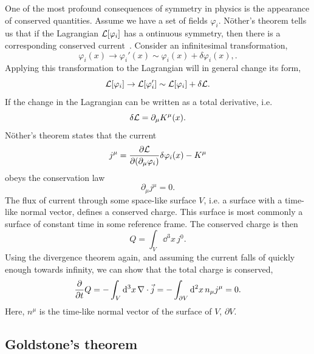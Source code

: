 One of the most profound consequences of symmetry in physics is the appearance of conserved quantities.
Assume we have a set of fields $\varphi_i$. Nöther's theorem tells us that if the Lagrangian $\mathcal{L}[\varphi_i]$ has a ontinuous symmetry, then there is a corresponding conserved current~\cite{Peskin:IntroQFT,Carroll:spacetime}.
Consider an infinitesimal transformation,
\begin{equation*}
    \varphi_i(x) \longrightarrow \varphi_i'(x)
    \sim \varphi_i(x) + \delta \varphi_i(x),.
\end{equation*}
Applying this transformation to the Lagrangian will in general change its form,
\begin{equation*}
    \mathcal{L}[\varphi_i] \rightarrow \mathcal{L}[\varphi_i']
    \sim \mathcal{L}[\varphi_i] + \delta \mathcal{L}.
\end{equation*}
If the change in the Lagrangian can be written as a total derivative, i.e.
\begin{equation*}
    \delta \mathcal{L} = \partial_\mu K^\mu(x).
\end{equation*}
Nöther's theorem states that the current
\begin{equation}
    j^\mu = \pdv{\mathcal{L}}{(\partial_\mu \varphi_i)} \delta \varphi_i(x) - K^\mu
\end{equation}
obeys the conservation law
\begin{equation}
    \partial_\mu j^\mu = 0.
\end{equation}
The flux of current through some space-like surface $V$, i.e. a surface with a time-like normal vector, defines a conserved charge. This surface is most commonly a surface of constant time in some reference frame. The conserved charge is then
\begin{equation*}
    Q = \int_V \dd^3 x \, j^0.
\end{equation*} 
Using the divergence theorem again, and assuming the current falls of quickly enough towards infinity, we can show that the total charge is conserved,
\begin{equation*}
    \pdv{t} Q = - \int_V \dd^3 x \, \nabla \cdot \vec j = - \int_{\partial V} \dd^2 x\, n_\mu j^\mu = 0.
\end{equation*}
Here, $n^\mu$ is the time-like normal vector of the surface of $V$, $\partial V$.


\subsection*{Goldstone's theorem}

